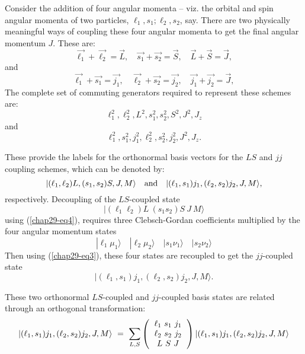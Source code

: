 Consider the addition of four angular momenta -- viz. the orbital and spin 
angular momenta of two particles, $\ell_1, s_1; \ell_2, s_2$, say. There are two 
physically meaningful ways of coupling these four angular momenta to get the final 
angular momentum $J$. These are:
\begin{equation}
\vec{\ell_1}+\vec{\ell_2} = \vec{L},\quad \vec{s_1}+\vec{s_2} = \vec{S},\quad \vec{L}+\vec{S} = \vec{J},\label{chap29-eq44}
\end{equation}
and 
\begin{equation}
\vec{\ell_1}+\vec{s_1} = \vec{j_1},\quad \vec{\ell_2}+\vec{s_2} = \vec{j_2},\quad \vec{j_1}+\vec{j_2} = \vec{J},\label{chap29-eq45}
\end{equation}
The complete set of commuting generators required to represent these schemes are:
\begin{equation}
\ell_1^2, \ell_2^2, L^2, s_1^2, s_2^2, S^2, J^2, J_z \label{chap29-eq46}
\end{equation}
and
\begin{equation}
\ell_1^2, s_1^2, j_1^2, \ell_2^2, s_2^2, j_2^2, J^2, J_z. \label{chap29-eq47}
\end{equation}

These provide the labels for the orthonormal basis vectors for the $LS$ and $jj$ 
coupling schemes, which can be denoted by:
\begin{equation}
|(\ell_1, \ell_2) L, (s_1, s_2) S, J, M\rangle \quad {\rm and} \quad |(\ell_1, s_1) j_1, (\ell_2, s_2) j_2, J, M\rangle ,\label{chap29-eq48}
\end{equation}
respectively. Decoupling  of the $LS$-coupled state
\begin{equation*}
|(\ell_1 \ell_2) L\ (s_1 s_2) S\ J\ M \rangle \label{chap29-eq48a}
\end{equation*}
using (\eqref{chap29-eq4}), requires three Clebsch-Gordan coefficients multiplied by the four angular momentum states
\begin{equation}
|\ell_1 \mu_1 \rangle \quad |\ell_2 \mu_2 \rangle \quad |s_1 \nu_1 \rangle \quad  |s_2 \nu_2 \rangle \label{chap29-eq49}
\end{equation}
Then using (\eqref{chap29-eq3}), these four states are recoupled to get the $jj$-coupled state  
\begin{equation*}
|(\ell_1, s_1) j_1, (\ell_2, s_2) j_2, J, M\rangle.\label{chap29-eq48b}
\end{equation*}

These two orthonormal $LS$-coupled and $jj$-coupled basis states are related through an orthogonal transformation:
\begin{equation}
|(\ell_1, s_1) j_1, (\ell_2, s_2) j_2, J, M\rangle \ =\ 
\sum_{L,S} 
\left(
\begin{tabular}{c}
$\ell_1 \ s_1 \ j_1$\\   
$\ell_2 \ s_2 \ j_2$\\ 
$L \ S \ J$\\ 
\end{tabular}
\right)
|(\ell_1, s_1) j_1, (\ell_2, s_2) j_2, J, M\rangle  \label{chap29-eq50}
\end{equation}

